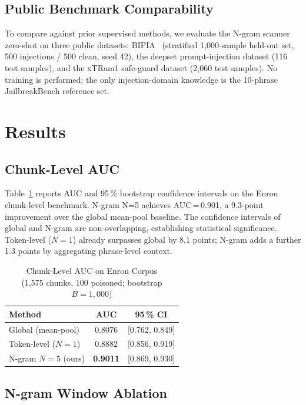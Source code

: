 \documentclass[conference]{IEEEtran}
\begin{document}
\subsection{Public Benchmark Comparability}

To compare against prior supervised methods, we evaluate the N-gram scanner
zero-shot on three public datasets: BIPIA~\cite{yi2025bipia}
(stratified 1,000-sample held-out set, 500 injections / 500 clean, seed 42),
the deepset prompt-injection dataset (116 test samples), and the xTRam1 safe-guard
dataset (2,060 test samples). No training is performed; the only injection-domain
knowledge is the 10-phrase JailbreakBench reference set.

\section{Results}
\label{sec:results}

\subsection{Chunk-Level AUC}

Table~\ref{tab:chunklevel} reports AUC and 95\,\% bootstrap confidence intervals on
the Enron chunk-level benchmark. N-gram N=5 achieves AUC\,=\,0.901, a 9.3-point
improvement over the global mean-pool baseline. The confidence intervals of global
and N-gram are non-overlapping, establishing statistical significance. Token-level
(\(N=1\)) already surpasses global by 8.1 points; N-gram adds a further 1.3 points
by aggregating phrase-level context.

\begin{table}[t]
\caption{Chunk-Level AUC on Enron Corpus\\
(1,575 chunks, 100 poisoned; bootstrap \(B=1{,}000\))}
\label{tab:chunklevel}
\centering
\begin{tabular}{lcc}
\toprule
Method & AUC & 95\,\% CI \\
\midrule
Global (mean-pool) & 0.8076 & [0.762, 0.849] \\
Token-level (\(N=1\)) & 0.8882 & [0.856, 0.919] \\
N-gram \(N=5\) (ours) & \textbf{0.9011} & [0.869, 0.930] \\
\bottomrule
\end{tabular}
\end{table}

\subsection{N-gram Window Ablation}
\end{document}
